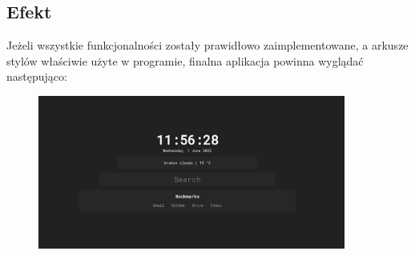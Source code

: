 \documentclass[twoside,a4paper]{report}
\begin{document}
\subsection{Efekt}
Jeżeli wszystkie funkcjonalności zostały prawidłowo zaimplementowane, a arkusze stylów właściwie użyte w programie, finalna aplikacja powinna wyglądać następująco:
\begin{figure}[H]
    \centering
    \includegraphics[width=0.9\textwidth]{img/final_app.png}
\end{figure}

\end{document}

